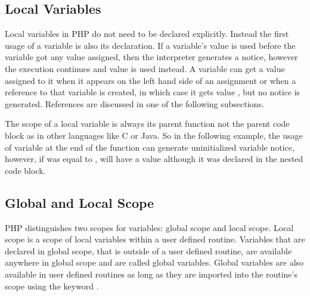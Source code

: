     \subsection{Local Variables}
    Local variables in PHP do not need to be declared explicitly. 
    Instead the first usage of a variable is also its declaration. 
    If a variable's value is used before the variable got any 
    value assigned, then the interpreter generates a notice, 
    however the execution continues and value  is 
    used instead. A variable can get a value assigned to it when it 
    appears on the left hand side of an assignment or when a 
    reference to that variable is created, in which case it gets value 
    , but no notice is generated. References are 
    discussed in one of the following subsections.

    The scope of a local variable is always its parent function not the 
    parent code block as in other languages like C or Java. 
    So in the following 
    example, the usage of variable  at the end 
    of the function can generate uninitialized variable notice, 
    however, if  was equal to , 
     will have a value although it 
    was declared in the nested code block.

    
    \subsection{Global and Local Scope}
    PHP distinguishes two scopes for variables: global scope and 
    local scope. Local scope is a scope of local variables 
    within a user defined routine.         
    Variables that are declared 
    in global scope, that is outside of a user defined routine, 
    are available anywhere in global scope and are called 
    global variables. Global variables are also available 
    in user defined routines as long as they are imported 
    into the routine's scope using the keyword .
    

